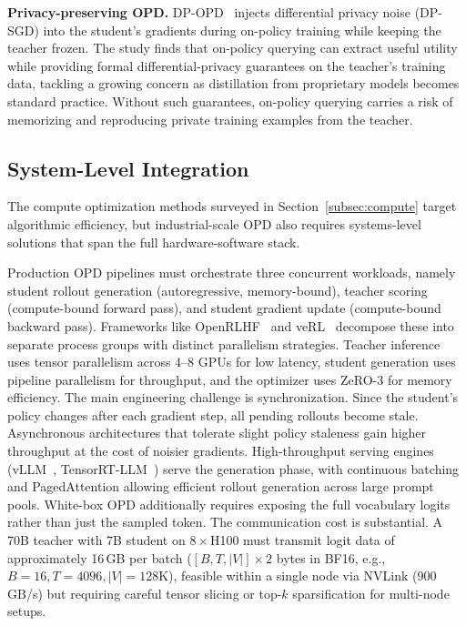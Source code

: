\documentclass{article} %
\begin{document}
\textbf{Privacy-preserving OPD.} DP-OPD~\citep{2604.04461} injects differential privacy noise (DP-SGD) into the student's gradients during on-policy training while keeping the teacher frozen. The study finds that on-policy querying can extract useful utility while providing formal differential-privacy guarantees on the teacher's training data, tackling a growing concern as distillation from proprietary models becomes standard practice. Without such guarantees, on-policy querying carries a risk of memorizing and reproducing private training examples from the teacher.

\subsection{System-Level Integration}
\label{subsec:systems}

The compute optimization methods surveyed in Section~\ref{subsec:compute} target algorithmic efficiency, but industrial-scale OPD also requires systems-level solutions that span the full hardware-software stack.

Production OPD pipelines must orchestrate three concurrent workloads, namely student rollout generation (autoregressive, memory-bound), teacher scoring (compute-bound forward pass), and student gradient update (compute-bound backward pass). Frameworks like OpenRLHF~\citep{2405.11143} and veRL~\citep{2409.19256} decompose these into separate process groups with distinct parallelism strategies. Teacher inference uses tensor parallelism across 4--8 GPUs for low latency, student generation uses pipeline parallelism for throughput, and the optimizer uses ZeRO-3 for memory efficiency. The main engineering challenge is synchronization. Since the student's policy changes after each gradient step, all pending rollouts become stale. Asynchronous architectures that tolerate slight policy staleness gain higher throughput at the cost of noisier gradients. High-throughput serving engines (vLLM~\citep{2309.06180}, TensorRT-LLM~\citep{nvidia2024tensorrtllm}) serve the generation phase, with continuous batching and PagedAttention allowing efficient rollout generation across large prompt pools. White-box OPD additionally requires exposing the full vocabulary logits rather than just the sampled token. The communication cost is substantial. A 70B teacher with 7B student on $8\times$H100 must transmit logit data of approximately 16\,GB per batch ($[B, T, |V|] \times 2$ bytes in BF16, e.g., $B{=}16, T{=}4096, |V|{=}128$K), feasible within a single node via NVLink (900\,GB/s) but requiring careful tensor slicing or top-$k$ sparsification for multi-node setups.
\end{document}
